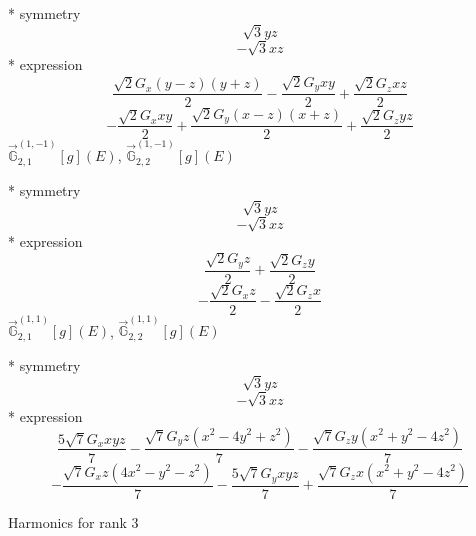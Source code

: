 \documentclass[fleqn,8pt]{jsarticle}
\begin{document}
\noindent\quad ** symmetry
\begin{dmath*}
\sqrt{3} y z
\end{dmath*}
\begin{dmath*}
- \sqrt{3} x z
\end{dmath*}
\noindent\quad ** expression
\begin{dmath*}
\frac{\sqrt{2} G_{x} \left(y - z\right) \left(y + z\right)}{2} - \frac{\sqrt{2} G_{y} x y}{2} + \frac{\sqrt{2} G_{z} x z}{2}
\end{dmath*}
\begin{dmath*}
- \frac{\sqrt{2} G_{x} x y}{2} + \frac{\sqrt{2} G_{y} \left(x - z\right) \left(x + z\right)}{2} + \frac{\sqrt{2} G_{z} y z}{2}
\end{dmath*}
\noindent\quad $\vec{\mathbb{G}}_{2,1}^{(1,-1)}[g](E)$, $\vec{\mathbb{G}}_{2,2}^{(1,-1)}[g](E)$

\noindent\quad ** symmetry
\begin{dmath*}
\sqrt{3} y z
\end{dmath*}
\begin{dmath*}
- \sqrt{3} x z
\end{dmath*}
\noindent\quad ** expression
\begin{dmath*}
\frac{\sqrt{2} G_{y} z}{2} + \frac{\sqrt{2} G_{z} y}{2}
\end{dmath*}
\begin{dmath*}
- \frac{\sqrt{2} G_{x} z}{2} - \frac{\sqrt{2} G_{z} x}{2}
\end{dmath*}
\noindent\quad $\vec{\mathbb{G}}_{2,1}^{(1,1)}[g](E)$, $\vec{\mathbb{G}}_{2,2}^{(1,1)}[g](E)$

\noindent\quad ** symmetry
\begin{dmath*}
\sqrt{3} y z
\end{dmath*}
\begin{dmath*}
- \sqrt{3} x z
\end{dmath*}
\noindent\quad ** expression
\begin{dmath*}
\frac{5 \sqrt{7} G_{x} x y z}{7} - \frac{\sqrt{7} G_{y} z \left(x^{2} - 4 y^{2} + z^{2}\right)}{7} - \frac{\sqrt{7} G_{z} y \left(x^{2} + y^{2} - 4 z^{2}\right)}{7}
\end{dmath*}
\begin{dmath*}
- \frac{\sqrt{7} G_{x} z \left(4 x^{2} - y^{2} - z^{2}\right)}{7} - \frac{5 \sqrt{7} G_{y} x y z}{7} + \frac{\sqrt{7} G_{z} x \left(x^{2} + y^{2} - 4 z^{2}\right)}{7}
\end{dmath*}

\noindent * Harmonics for rank 3
\end{document}
